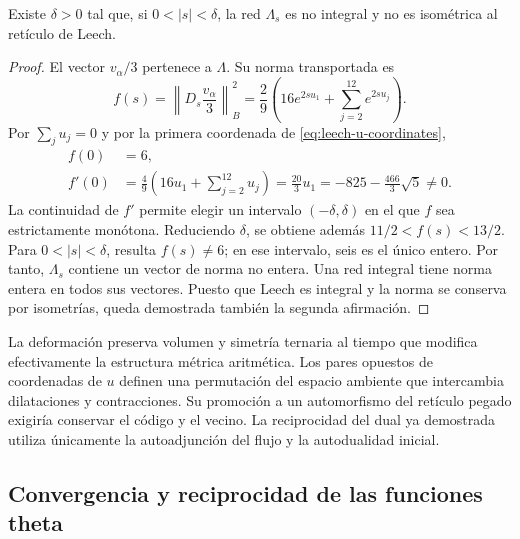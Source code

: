 \begin{proposition}
\label{prop:leech-nonintegral}
Existe \(\delta>0\) tal que, si \(0<|s|<\delta\), la red
\(\Lambda_s\) es no integral y no es isométrica al retículo de Leech.
\end{proposition}
\begin{proof}
El vector \(v_\alpha/3\) pertenece a \(\Lambda\). Su norma
transportada es
\begin{equation}
 f(s)=\left\|D_s\frac{v_\alpha}{3}\right\|_B^2
 =\frac29\left(16e^{2su_1}+
                       \sum_{j=2}^{12}e^{2su_j}\right).
 \label{eq:leech-witness}
\end{equation}
Por \(\sum_j u_j=0\) y por la primera coordenada de
\eqref{eq:leech-u-coordinates},
\begin{equation}
\begin{split}
 f(0)&=6,\\
 f'(0)&=\frac49\left(16u_1+\sum_{j=2}^{12}u_j\right)
       =\frac{20}{3}u_1
       =-825-\frac{466}{3}\sqrt5\ne0.
\end{split}
\label{eq:leech-witness-derivative}
\end{equation}
La continuidad de \(f'\) permite elegir un intervalo
\((-\delta,\delta)\) en el que \(f\) sea estrictamente monótona.
Reduciendo \(\delta\), se obtiene además
\(11/2<f(s)<13/2\). Para \(0<|s|<\delta\), resulta \(f(s)\ne6\);
en ese intervalo, seis es el único entero. Por tanto, \(\Lambda_s\)
contiene un vector de norma no entera. Una red integral tiene
norma entera en todos sus vectores. Puesto que Leech es integral
y la norma se conserva por isometrías, queda demostrada también
la segunda afirmación.
\end{proof}

La deformación preserva volumen y simetría ternaria al tiempo que
modifica efectivamente la estructura métrica aritmética. Los pares
opuestos de coordenadas de \(u\) definen una permutación del espacio
ambiente que intercambia dilataciones y contracciones. Su promoción
a un automorfismo del retículo pegado exigiría conservar el código
y el vecino. La reciprocidad del dual ya demostrada utiliza
únicamente la autoadjunción del flujo y la autodualidad inicial.

\subsection{Convergencia y reciprocidad de las funciones theta}
\label{subsec:leech-theta}

